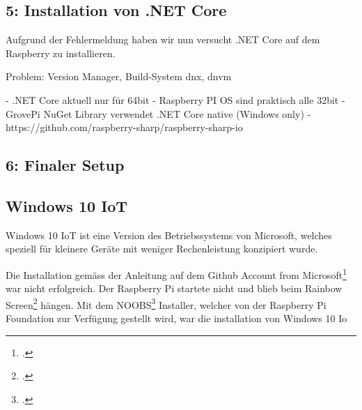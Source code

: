 
\subsection{5: Installation von .NET Core}
Aufgrund der Fehlermeldung haben wir nun versucht .NET Core auf dem Raspberry zu installieren.


Problem: Version Manager, Build-System
dnx, dnvm
  
    - .NET Core aktuell nur für 64bit
    - Raspberry PI OS sind praktisch alle 32bit
    - GrovePi NuGet Library verwendet .NET Core native (Windows only)
    - https://github.com/raspberry-sharp/raspberry-sharp-io
\subsection{6: Finaler Setup}



\subsection{Windows 10 IoT}
Windows 10 IoT ist eine Version des Betriebssystems von Microsoft, welches speziell für kleinere Geräte mit weniger Rechenleistung konzipiert wurde.

Die Installation gemäss der Anleitung auf dem Github Account from Microsoft\footcite{install_win10iot_2016-04-25} war nicht erfolgreich. 
Der Raspberry Pi startete nicht und blieb beim Rainbow Screen\footcite{RPi_Rainbowscreen_2016-04-25} hängen. 
Mit dem NOOBS\footcite{NOOBS_2016-04-25} Installer, welcher von der Raspberry Pi Foundation zur Verfügung gestellt wird, war die installation von Windows 10 Io


